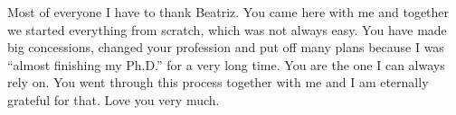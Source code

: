 Most of everyone I have to thank Beatriz. You came here with me and together we started everything from scratch, which was not always easy. You have made big concessions, changed your profession and put off many plans because I was ``almost finishing my Ph.D.'' for a very long time. You are the one I can always rely on. You went through this process together with me and I am eternally grateful for that. Love you very much.